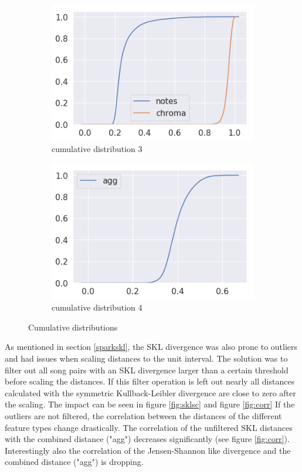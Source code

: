 \begin{figure}[htbp]
{{			\begin{subfigure}{.495\textwidth}
				\centering     
				\includegraphics[scale=0.5]{Images/SparkFeat/cum3.png}
				\caption{cumulative distribution 3}
				\label{cum3}
			\end{subfigure}%
			\begin{subfigure}{.495\textwidth}
				\centering    
				\includegraphics[scale=0.5]{Images/SparkFeat/cum4.png}
				\caption{cumulative distribution 4}
				\label{cum4}
			\end{subfigure}	
	}}
	\caption{Cumulative distributions}
	\label{fig:cumdist}
\end{figure}
\FloatBarrier

\noindent As mentioned in section \ref{sparkskl}, the SKL divergence was also prone to outliers and had issues when scaling distances to the unit interval. The solution was to filter out all song pairs with an SKL divergence larger than a certain threshold before scaling the distances. If this filter operation is left out nearly all distances calculated with the symmetric Kullback-Leibler divergence are close to zero after the scaling. The impact can be seen in figure \ref{fig:sklsc} and figure \ref{fig:corr}
\noindent If the outliers are not filtered, the correlation between the distances of the different feature types change drastically. The correlation of the unfiltered SKL distances with the combined distance ("agg") decreases significantly (see figure \ref{fig:corr}). Interestingly also the correlation of the Jensen-Shannon like divergence and the combined distance ("agg") is dropping. 

